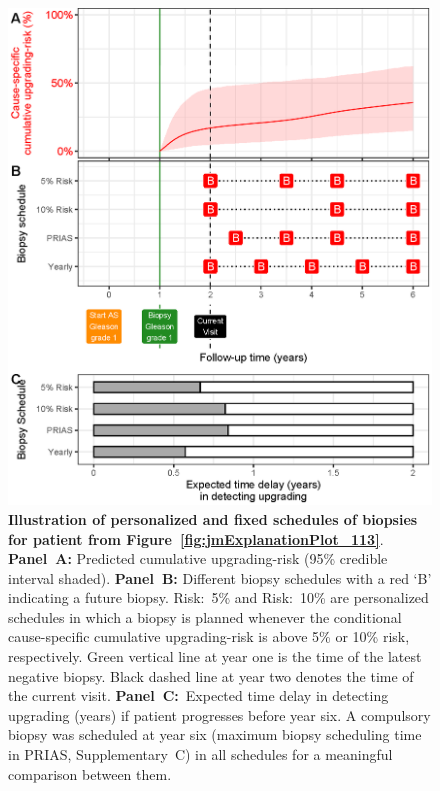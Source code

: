 \begin{figure}
\centerline{\includegraphics[width=\columnwidth]{images/demo_pat1.eps}}
\caption{\textbf{Illustration of personalized and fixed schedules of biopsies for patient from Figure~\ref{fig:jmExplanationPlot_113}}. \textbf{Panel~A:} Predicted cumulative upgrading-risk (95\% credible interval shaded). \textbf{Panel~B:} Different biopsy schedules with a red `B' indicating a future biopsy. Risk:~5\% and Risk:~10\% are personalized schedules in which a biopsy is planned whenever the conditional cause-specific cumulative upgrading-risk is above 5\% or 10\% risk, respectively. Green vertical line at year one is the time of the latest negative biopsy. Black dashed line at year two denotes the time of the current visit. \textbf{Panel~C:}\ Expected time delay in detecting upgrading (years) if patient progresses before year six. A compulsory biopsy was scheduled at year six (maximum biopsy scheduling time in PRIAS, Supplementary~C) in all schedules for a meaningful comparison between them.}
\label{fig:demo_pat1}
\end{figure}

